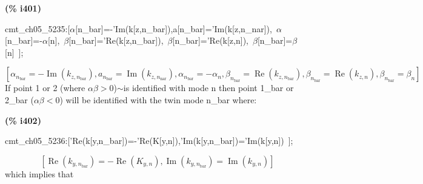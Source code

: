 \documentclass[fleqn]{article}
\begin{document}
\noindent
\begin{minipage}[t]{4.000000em}\color{red}\bfseries
(\% i401)	
\end{minipage}
\begin{minipage}[t]{\textwidth}\color{blue}
cmt\_ch05\_5235:[\ensuremath{\alpha}[n\_bar]=-'Im(k[z,n\_bar]),a[n\_bar]='Im(k[z,n\_nar]),\ \ensuremath{\alpha}[n\_bar]=-\ensuremath{\alpha}[n],\ \ensuremath{\beta}[n\_bar]='Re(k[z,n\_bar]),\ \ensuremath{\beta}[n\_bar]='Re(k[z,n]),\ \ensuremath{\beta}[n\_bar]=\ensuremath{\beta}[n]\ ];
\end{minipage}
\[\displaystyle \tag{\% o401} 
\operatorname{[}{{\alpha }_{{n_{\ensuremath{\mathrm{bar}}}}}}=-\operatorname{Im}\left( {k_{z,{n_{\ensuremath{\mathrm{bar}}}}}}\right) \operatorname{,}{a_{{n_{\ensuremath{\mathrm{bar}}}}}}=\operatorname{Im}\left( {k_{z,{n_{\ensuremath{\mathrm{nar}}}}}}\right) \operatorname{,}{{\alpha }_{{n_{\ensuremath{\mathrm{bar}}}}}}=-{{\alpha }_n}\operatorname{,}{{\beta }_{{n_{\ensuremath{\mathrm{bar}}}}}}=\operatorname{Re}\left( {k_{z,{n_{\ensuremath{\mathrm{bar}}}}}}\right) \operatorname{,}{{\beta }_{{n_{\ensuremath{\mathrm{bar}}}}}}=
\operatorname{Re}\left( {k_{z,n}}\right) \operatorname{,}{{\beta }_{{n_{\ensuremath{\mathrm{bar}}}}}}={{\beta }_n}\operatorname{]}\mbox{}
\]
If point 1 or 2 (where \ensuremath{\alpha}\ensuremath{\beta}\ensuremath{>}0)\ensuremath{\sim }is identified with mode n then point 1\_bar or 2\_bar (\ensuremath{\alpha}\ensuremath{\beta}\ensuremath{<}0) will be identified with the twin mode n\_bar where:


\noindent
\begin{minipage}[t]{4.000000em}\color{red}\bfseries
(\% i402)	
\end{minipage}
\begin{minipage}[t]{\textwidth}\color{blue}
cmt\_ch05\_5236:['Re(k[y,n\_bar])=-'Re(K[y,n]),'Im(k[y,n\_bar])='Im(k[y,n])\ ];
\end{minipage}
\[\displaystyle \tag{\% o402} 
\left[ \operatorname{Re}\left( {k_{y,{n_{\ensuremath{\mathrm{bar}}}}}}\right) =-\operatorname{Re}\left( {K_{y,n}}\right) \operatorname{,}\operatorname{Im}\left( {k_{y,{n_{\ensuremath{\mathrm{bar}}}}}}\right) =\operatorname{Im}\left( {k_{y,n}}\right) \right] \mbox{}
\]
which implies that
\end{document}
